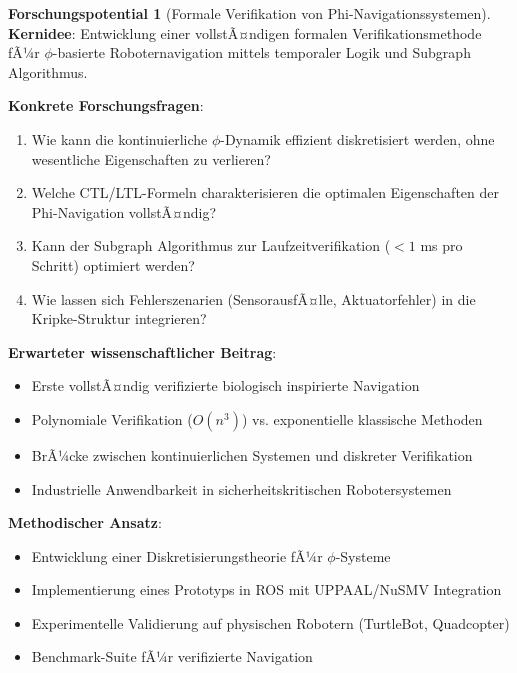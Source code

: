 ﻿\documentclass[a4paper,12pt]{article}
\theoremstyle{definition}
\newtheorem{potential}{Forschungspotential}[section]
\begin{document}
\begin{potential}[Formale Verifikation von Phi-Navigationssystemen]
\textbf{Kernidee}: Entwicklung einer vollstÃ¤ndigen formalen Verifikationsmethode fÃ¼r $\phi$-basierte Roboternavigation mittels temporaler Logik und Subgraph Algorithmus.

\textbf{Konkrete Forschungsfragen}:
\begin{enumerate}
	\item Wie kann die kontinuierliche $\phi$-Dynamik effizient diskretisiert werden, ohne wesentliche Eigenschaften zu verlieren?
	\item Welche CTL/LTL-Formeln charakterisieren die optimalen Eigenschaften der Phi-Navigation vollstÃ¤ndig?
	\item Kann der Subgraph Algorithmus zur Laufzeitverifikation ($< 1$ ms pro Schritt) optimiert werden?
	\item Wie lassen sich Fehlerszenarien (SensorausfÃ¤lle, Aktuatorfehler) in die Kripke-Struk\-tur integrieren?
\end{enumerate}

\textbf{Erwarteter wissenschaftlicher Beitrag}:
\begin{itemize}
	\item Erste vollstÃ¤ndig verifizierte biologisch inspirierte Navigation
	\item Polynomiale Verifikation ($O(n^3)$) vs. exponentielle klassische Methoden
	\item BrÃ¼cke zwischen kontinuierlichen Systemen und diskreter Verifikation
	\item Industrielle Anwendbarkeit in sicherheitskritischen Robotersystemen
\end{itemize}

\textbf{Methodischer Ansatz}:
\begin{itemize}
	\item Entwicklung einer Diskretisierungstheorie fÃ¼r $\phi$-Systeme
	\item Implementierung eines Prototyps in ROS mit UPPAAL/NuSMV Integration
	\item Experimentelle Validierung auf physischen Robotern (TurtleBot, Quadcopter)
	\item Benchmark-Suite fÃ¼r verifizierte Navigation
\end{itemize}
\end{potential}
\end{document}
